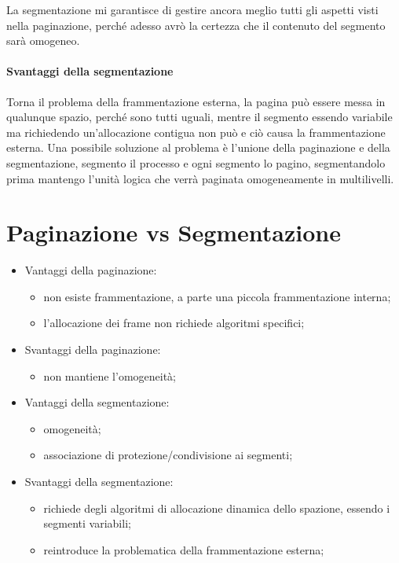 \documentclass[a4paper, 12pt]{book}
\begin{document}
La segmentazione mi garantisce di gestire ancora meglio tutti gli aspetti visti nella paginazione, perché adesso avrò la certezza
che il contenuto del segmento sarà omogeneo.

\paragraph{Svantaggi della segmentazione}

Torna il problema della frammentazione esterna, la pagina può essere messa in qualunque spazio, perché sono tutti uguali, 
mentre il segmento essendo variabile ma richiedendo un'allocazione contigua non può e ciò causa la frammentazione esterna. 
Una possibile soluzione al problema è l'unione della paginazione e della segmentazione, segmento il processo e ogni segmento lo 
pagino, segmentandolo prima mantengo l'unità logica che verrà paginata omogeneamente in multilivelli.

\section{Paginazione vs Segmentazione}

\begin{itemize}
    \item Vantaggi della paginazione:
    \begin{itemize}
        \item non esiste frammentazione, a parte una piccola frammentazione interna;
        \item l'allocazione dei frame non richiede algoritmi specifici;
    \end{itemize}
    \item Svantaggi della paginazione:
    \begin{itemize}
        \item non mantiene l'omogeneità;
    \end{itemize}
    \item Vantaggi della segmentazione:
    \begin{itemize}
        \item omogeneità;
        \item associazione di protezione/condivisione ai segmenti;
    \end{itemize}
    \item Svantaggi della segmentazione:
    \begin{itemize}
        \item richiede degli algoritmi di allocazione dinamica dello spazione, essendo i segmenti variabili;
        \item reintroduce la problematica della frammentazione esterna;
    \end{itemize}
\end{itemize}
\end{document}
